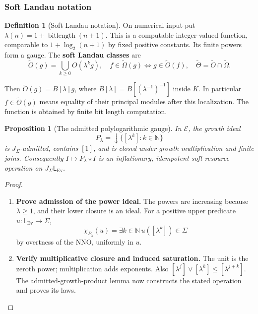 \documentclass[11pt,a4paper]{article}
\numberwithin{algorithm}{section}
\numberwithin{equation}{section}
\newtheorem{proposition}[proposition]{Proposition}
\theoremstyle{definition}
\newtheorem{definition}[definition]{Definition}
\theoremstyle{remark}
\theoremstyle{plain}
\newcommand{\E}{\mathcal E}
\newcommand{\N}{\mathbb N}
\newcommand{\J}{J_{\Sigma}}
\newcommand{\Ev}{{\operatorname{Ev}}}
\theoremstyle{definition}
\theoremstyle{plain}
\begin{document}
\subsubsection{Soft Landau notation}


\begin{definition}[Soft Landau notation]\label{def:soft-landau}
On numerical input put
$\lambda(n)=1+\operatorname{bitlength}(n+1)$.
This is a computable integer-valued function, comparable to
$1+\log_2(n+1)$ by fixed positive constants. Its finite powers
form a gauge. The \textbf{soft Landau classes} are
\[
 \widetilde O(g)=\bigcup_{k\ge0}O(\lambda^k g),\quad
 f\in\widetilde\Omega(g)\iff g\in\widetilde O(f),\quad
 \widetilde\Theta=\widetilde O\cap\widetilde\Omega.
\]
\end{definition}


Then $\widetilde O(g)=B[\lambda]g$, where
$B[\lambda]=B[(\lambda^{-1})^{-1}]$ inside $K$.
In particular $f\in\widetilde\Theta(g)$ means equality of
their principal modules after this localization.
The function is obtained by finite bit length computation.

\begin{proposition}[The admitted polylogarithmic gauge]
\label{prop:admitted-soft-gauge}
In $\E$, the growth ideal
\[
 P_\lambda=\downarrow\{[\lambda^k]:k\in\N\}
\]
is $\J$-admitted, contains $[1]$, and is closed under growth
multiplication and finite joins.  Consequently
$I\mapsto P_\lambda\star I$ is an inflationary,
idempotent soft-resource operation on $\J\mathsf L_{\Ev}$.
\end{proposition}
\begin{proof}\leavevmode
\begin{enumerate}[leftmargin=*,align=left]
\item \textbf{Prove admission of the power ideal.}
The powers are increasing because $\lambda\ge1$, and their
lower closure is an ideal.  For a positive upper predicate
$u:\mathsf L_{\Ev}\to\Sigma$,
\[
 \chi_{P_\lambda}(u)
 =\exists k\in\N\,u([\lambda^k])\in\Sigma
\]
by overtness of the NNO, uniformly in $u$.

\item \textbf{Verify multiplicative closure and induced saturation.}
The unit is the
zeroth power; multiplication adds exponents.  Also
$[\lambda^j]\vee[\lambda^k]\le[\lambda^{j+k}]$.
The admitted-growth-product lemma now constructs the stated
operation and proves its laws.
\end{enumerate}
\end{proof}
\end{document}
